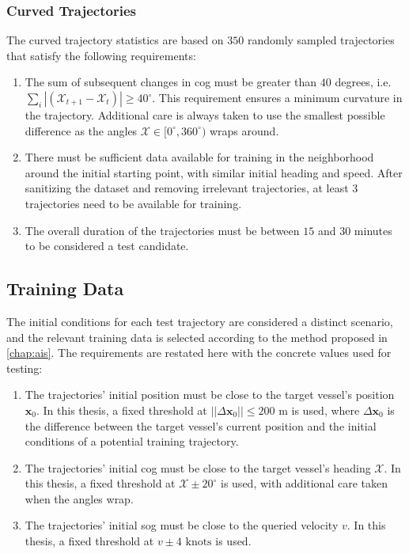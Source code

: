 \subsubsection{Curved Trajectories}
The curved trajectory statistics are based on $350$ randomly sampled trajectories that satisfy the following requirements:
\begin{enumerate}
    \item The sum of subsequent changes in \acrshort{cog} must be greater than $40$ degrees, i.e. $\sum_i |(\mathcal{X}_{t+1} - \mathcal{X}_t)| \geq 40^\circ$. This requirement ensures a minimum curvature in the trajectory. Additional care is always taken to use the smallest possible difference as the angles $\mathcal{X} \in [0^\circ, 360^\circ)$ wraps around.
    \item There must be sufficient data available for training in the neighborhood around the initial starting point, with similar initial heading and speed. After sanitizing the dataset and removing irrelevant trajectories, at least $3$ trajectories need to be available for training.
    \item The overall duration of the trajectories must be between $15$ and $30$ minutes to be considered a test candidate.
\end{enumerate}

\subsection{Training Data}
The initial conditions for each test trajectory are considered a distinct scenario, and the relevant training data is selected according to the method proposed in \cref{chap:ais}. The requirements are restated here with the concrete values used for testing:

\begin{enumerate}
    \item The trajectories' initial position must be close to the target vessel's position $\boldsymbol{x}_0$. In this thesis, a fixed threshold at $||\Delta \boldsymbol{x}_0|| \leq 200 \text{ m}$ is used, where $\Delta \boldsymbol{x}_0$ is the difference between the target vessel's current position and the initial conditions of a potential training trajectory.
    \item The trajectories' initial \acrshort{cog} must be close to the target vessel's heading $\mathcal{X}$. In this thesis, a fixed threshold at $\mathcal{X} \pm 20^\circ$ is used, with additional care taken when the angles wrap.
    \item The trajectories' initial \acrshort{sog} must be close to the queried velocity $v$. In this thesis, a fixed threshold at $v \pm 4 \text{ knots}$ is used.
\end{enumerate}

